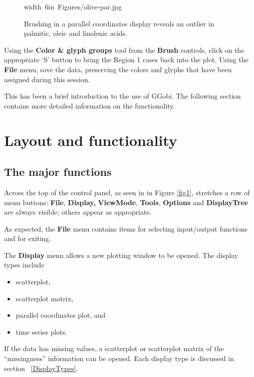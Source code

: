 \documentclass[11pt]{article}
\begin{document}
\begin{figure}[htp]
\hbox{\pdfimage width 6in {Figures/olive-par.jpg}}
\caption{Brushing in a parallel coordinates display reveals an outlier in 
palmitic, oleic and linolenic acids.}
\label{fig7}
\end{figure}

Using the {\bf Color \& glyph groups} tool from the {\bf Brush}
controls, click on the appropriate `S' button to bring the Region 1
cases back into the plot.  Using the {\bf File} menu, save the data,
preserving the colors and glyphs that have been assigned during this
session.

This has been a brief introduction to the use of GGobi. The following
section contains more detailed information on the functionality.

\section{Layout and functionality}

\subsection{The major functions}

Across the top of the control panel, as seen in in Figure \ref{fig1},
stretches a row of menu buttons:  {\bf File}, {\bf Display,} {\bf
ViewMode}, {\bf Tools}, {\bf Options} and {\bf DisplayTree} are
always visible; others appear as appropriate.

As expected, the {\bf File} menu contains items for selecting
input/output functions and for exiting.

The {\bf Display} menu allows a new plotting window to be opened. 
The display types include
\begin{itemize}
\itemsep 0em
\item scatterplot,
\item scatterplot matrix, 
\item parallel coordinates plot, and
\item time series plots.
\end{itemize}

If the data has missing values, a scatterplot or scatterplot matrix
of the ``missingness'' information can be opened.  Each display type
is discussed in section ~\ref{DisplayTypes}.
\end{document}
